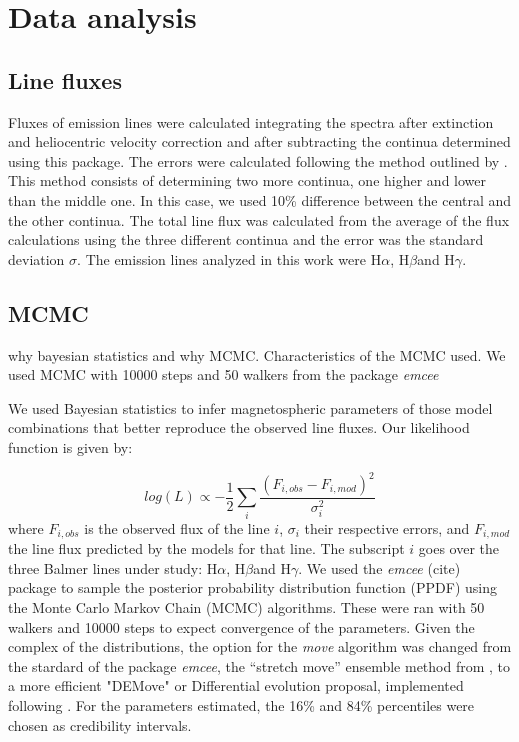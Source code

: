 \documentclass[twocolumn,linenumbers]{aastex631}
\newcommand{\halpha}{H$\alpha$}
\newcommand{\hbeta}{H$\beta$}
\newcommand{\hgamma}{H$\gamma$}
\begin{document}
\section{Data analysis}

\subsection{Line fluxes}

Fluxes of emission lines were calculated integrating the spectra after extinction and heliocentric velocity correction and after subtracting the continua determined using this package. The errors were calculated following the method outlined by \citet{alcala2014}. This method consists of determining two more continua, one higher and lower than the middle one. In this case, we used 10\% difference between the central and the other continua. The total line flux was calculated from the average of the flux calculations using the three different continua and the error was the standard deviation $\sigma$. The emission lines analyzed in this work were \halpha, \hbeta and \hgamma.


\subsection{MCMC}

why bayesian statistics and why MCMC. Characteristics of the MCMC used. 
We used MCMC with 10000 steps and 50 walkers from the package \textit{emcee}

We used Bayesian statistics to infer magnetospheric parameters of those model combinations that better reproduce the observed line fluxes. Our likelihood function is given by:

\begin{equation}
    log (L) \propto -\frac{1}{2} \sum_i \frac{(F_{i,obs}-F_{i,mod})^2}{\sigma_{i}^2}
\end{equation}
where $F_{i,obs}$ is the observed flux of the line $i$, $\sigma_i$ their respective errors, and $F_{i,mod}$ the line flux predicted by the models for that line. The subscript $i$ goes over the three Balmer lines under study: \halpha, \hbeta and \hgamma. We used the \textit{emcee} (cite) package to sample the posterior probability distribution function (PPDF) using the Monte Carlo Markov Chain (MCMC) algorithms. These were ran with 50 walkers and 10000 steps to expect convergence of the parameters. Given the complex of the distributions, the option for the \textit{move} algorithm was changed from the stardard of the package \textit{emcee}, the “stretch move” ensemble method from \citet{goodman-weare2010}, to a more efficient  "DEMove" or Differential evolution proposal, implemented following \citet{Nelson_2014}. For the parameters estimated, the 16\% and 84\% percentiles were chosen as credibility intervals.
\end{document}
